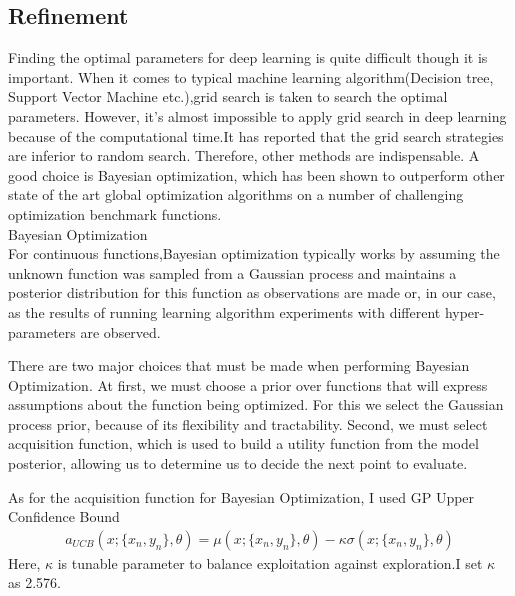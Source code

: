 \subsection{Refinement}

Finding the optimal parameters for deep learning is quite difficult though it is important. When it comes to typical machine learning algorithm(Decision tree, Support Vector Machine etc.),grid search is taken to search the optimal parameters. However, it's almost impossible to apply grid search in deep learning because of the computational time.It has reported that the grid search strategies are inferior to random search.\cite{Random} Therefore, other methods are indispensable. A good choice is Bayesian optimization, which has been shown to outperform other state of the art global optimization algorithms on a number of challenging optimization benchmark functions.\\

Bayesian Optimization\cite{Bayesian Optimization}\\


For continuous functions,Bayesian optimization typically works by assuming the unknown function was sampled from a Gaussian process and maintains a posterior distribution for this function as observations are made or, in our case, as the results of running learning algorithm experiments with different hyper-parameters are observed. 

There are two major choices that must be made when performing Bayesian Optimization. At first, we must choose a prior over functions that will express assumptions about the function being optimized. For this we select the Gaussian process prior, because of its flexibility and tractability. Second, we must select acquisition function, which is used to build a utility function from the model posterior, allowing us to determine us to decide the next point to evaluate.

As for the acquisition function for Bayesian Optimization, I used GP Upper Confidence Bound
 \begin{eqnarray}
a_{UCB}(x;\{x_n,y_n\},\theta)=\mu(x;\{x_n,y_n\},\theta)-\kappa\sigma(x;\{x_n,y_n\},\theta)
\end{eqnarray}
Here, $\kappa$ is tunable parameter to balance exploitation against exploration.I set $\kappa$ as 2.576.


